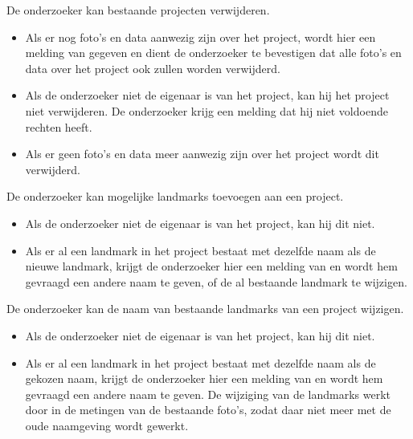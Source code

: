 \noindent
De onderzoeker kan bestaande projecten verwijderen.
\begin{itemize}
	\item Als er nog foto's en data aanwezig zijn over het project, wordt hier een melding van gegeven en dient de onderzoeker te bevestigen dat alle foto's en data over het project ook zullen worden verwijderd.
	\item Als de onderzoeker niet de eigenaar is van het project, kan hij het project niet verwijderen. De onderzoeker krijg een melding dat hij niet voldoende rechten heeft.
	\item Als er geen foto's en data meer aanwezig zijn over het project wordt dit verwijderd.
\end{itemize}


\noindent
De onderzoeker kan mogelijke landmarks toevoegen aan een project.
\begin{itemize}
	\item Als de onderzoeker niet de eigenaar is van het project, kan hij dit niet.
	\item Als er al een landmark in het project bestaat met dezelfde naam als de nieuwe landmark, krijgt de onderzoeker hier een melding van en wordt hem gevraagd een andere naam te geven, of de al bestaande landmark te wijzigen.
\end{itemize}

\noindent
De onderzoeker kan de naam van bestaande landmarks van een project wijzigen.
\begin{itemize}
	\item Als de onderzoeker niet de eigenaar is van het project, kan hij dit niet.
	\item Als er al een landmark in het project bestaat met dezelfde naam als de gekozen naam, krijgt de onderzoeker hier een melding van en wordt hem gevraagd een andere naam te geven. De wijziging van de landmarks werkt door in de metingen van de bestaande foto's, zodat daar niet meer met de oude naamgeving wordt gewerkt.
\end{itemize}

